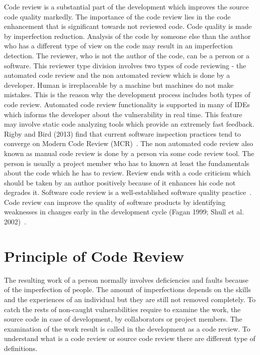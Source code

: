 Code review is a substantial part of the development which improves the source code quality markedly. The importance of the code review lies in the code enhancement that is significant towards not reviewed code. Code quality is made by imperfection reduction. Analysis of the code by someone else than the author who has a different type of view on the code may result in an imperfection detection. The reviewer, who is not the author of the code, can be a person or a software. This reviewer type division involves two types of code reviewing - the automated code review and the non automated review which is done by a developer. Human is irreplaceable by a machine but machines do not make mistakes. This is the reason why the development process includes both types of code review. Automated code review functionality is supported in many of IDEs which informs the developer about the vulnerability in real time. This feature may involve static code analyzing tools which provide an extremely fast feedback. Rigby and Bird (2013) find that current software inspection practices tend to converge on Modern Code Review (MCR)~\cite{review_participation}. The non automated code review also known as manual code review is done by a person via some code review tool. The person is usually a project member who has to known at least the fundamentals about the code which he has to review. Review ends with a code criticism which should be taken by an author positively because of it enhances his code not degrades it. Software code review is a well-established software quality practice~\cite{review_participation}. Code review can improve the quality of software products by identifying weaknesses in changes early in the development cycle (Fagan 1999; Shull et al. 2002)~\cite{review_participation}.

\section{Principle of Code Review}\label{fig:sec_pri_CR}

The resulting work of a person normally involves deficiencies and faults because of the imperfection of people. The amount of imperfections depends on the skills and the experiences of an individual but they are still not removed completely. To catch the rests of non-caught vulnerabilities require to examine the work, the source code in case of development, by collaborators or project members. The examination of the work result is called in the development as a code review. To understand what is a code review or source code review there are different type of definitions.

